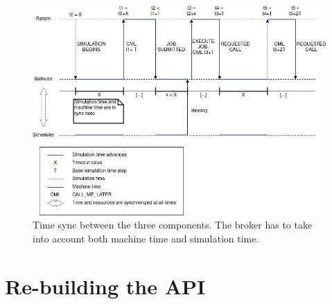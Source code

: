 \begin{figure}[H]
	\centering
	\includegraphics[width=\textwidth]{imgs/lignes_de_temps.png}
	\caption{Time sync between the three components. The broker has to take
	into account both machine time and simulation time.}
	\label{fig:time_sync}
\end{figure}


\section{Re-building the API}

